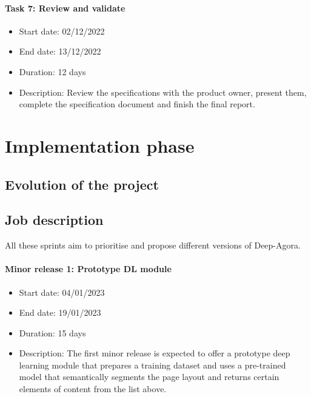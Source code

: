 \documentclass{polytech/polytech}
\numberwithin{figure}{chapter}
\begin{document}
\begin{appendix}
\paragraph{Task 7: Review and validate}
\begin{itemize}
    \item Start date: 02/12/2022
    \item End date: 13/12/2022
    \item Duration: 12 days
    \item
        Description: Review the specifications with the product owner, present them, complete the specification document and finish the final report.
\end{itemize}


\section{Implementation phase}

\subsection{Evolution of the project}

\label{planS10}

\subsection{Job description}

All these sprints aim to prioritise and propose different versions of Deep-Agora.

\paragraph{Minor release 1: Prototype DL module}
\begin{itemize}
    \item Start date: 04/01/2023
    \item End date: 19/01/2023
    \item Duration: 15 days
    \item
        Description: The first minor release is expected to offer a prototype deep learning module that prepares a training dataset and uses a pre-trained model that semantically segments the page layout and returns certain elements of content from the list above.
\end{itemize}


\end{appendix}
\end{document}
